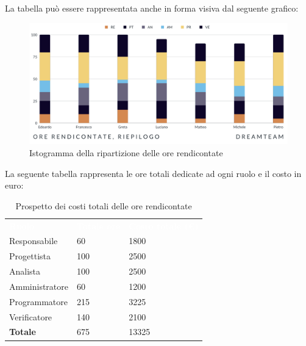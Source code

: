 La tabella può essere rappresentata anche in forma visiva dal seguente grafico:
\begin{figure}[H]
\centering
\includegraphics[scale=0.65]{Sezioni/SezioniPreventivo/grafici/Riepilogo_ore_rendicontate.png}
\caption{Istogramma della ripartizione delle ore rendicontate}
\end{figure}

La seguente tabella rappresenta le ore totali dedicate ad ogni ruolo e il costo in euro:

\begin{table}[H]
\begin{center}
\renewcommand{\arraystretch}{1.5}
\begin{tabular}{ m{}<{\centering}  m{}<{\centering} m{}<{\centering}}
	\rowcolor{darkblue}
	\textcolor{white}{\textbf{Ruolo}}&\textcolor{white}{\textbf{Totale ore}}&\textcolor{white}{\textbf{Costo totale (\euro)}}\\ 

	Responsabile  & 60 & 1800 \\	
	
	Progettista & 100 & 2500 \\
	
	Analista & 100 & 2500 \\

	Amministratore & 60 & 1200 \\
	
	Programmatore & 215 & 3225 \\
	
	Verificatore & 140 & 2100 \\
	
	\textbf{Totale} & 675 & 13325 \\
	
\end{tabular}
\caption{Prospetto dei costi totali delle ore rendicontate}
\end{center}
\end{table}

